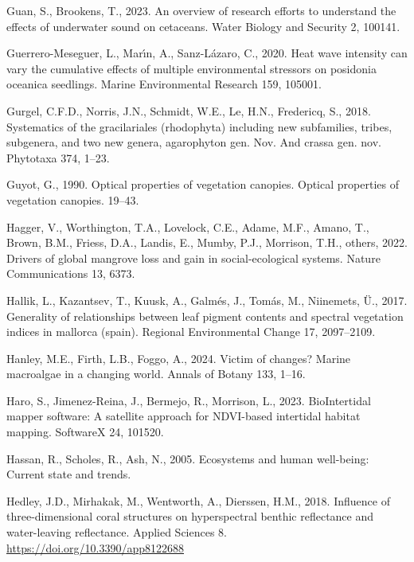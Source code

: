 \documentclass[
  letterpaper,
  11pt,
  english,
  singlespacing,
  headsepline]{MastersDoctoralThesis}
\newlength{\cslhangindent}
\newenvironment{CSLReferences}[2] %
 {\begin{list}{}{%
  \setlength{\itemindent}{0pt}
  \setlength{\leftmargin}{0pt}
  \setlength{\parsep}{0pt}
  \ifodd #1
   \setlength{\leftmargin}{\cslhangindent}
   \setlength{\itemindent}{-1\cslhangindent}
  \fi
  \setlength{\itemsep}{#2\baselineskip}}}
 {\end{list}}
\begin{document}
\begin{CSLReferences}{1}{0}
Guan, S., Brookens, T., 2023. An overview of research efforts to
understand the effects of underwater sound on cetaceans. Water Biology
and Security 2, 100141.

Guerrero-Meseguer, L., Marı́n, A., Sanz-Lázaro, C., 2020. Heat wave
intensity can vary the cumulative effects of multiple environmental
stressors on posidonia oceanica seedlings. Marine Environmental Research
159, 105001.

Gurgel, C.F.D., Norris, J.N., Schmidt, W.E., Le, H.N., Fredericq, S.,
2018. Systematics of the gracilariales (rhodophyta) including new
subfamilies, tribes, subgenera, and two new genera, agarophyton gen.
Nov. And crassa gen. nov. Phytotaxa 374, 1--23.

Guyot, G., 1990. Optical properties of vegetation canopies. Optical
properties of vegetation canopies. 19--43.

Hagger, V., Worthington, T.A., Lovelock, C.E., Adame, M.F., Amano, T.,
Brown, B.M., Friess, D.A., Landis, E., Mumby, P.J., Morrison, T.H.,
others, 2022. Drivers of global mangrove loss and gain in
social-ecological systems. Nature Communications 13, 6373.

Hallik, L., Kazantsev, T., Kuusk, A., Galmés, J., Tomás, M., Niinemets,
Ü., 2017. Generality of relationships between leaf pigment contents and
spectral vegetation indices in mallorca (spain). Regional Environmental
Change 17, 2097--2109.

Hanley, M.E., Firth, L.B., Foggo, A., 2024. Victim of changes? Marine
macroalgae in a changing world. Annals of Botany 133, 1--16.

Haro, S., Jimenez-Reina, J., Bermejo, R., Morrison, L., 2023.
BioIntertidal mapper software: A satellite approach for NDVI-based
intertidal habitat mapping. SoftwareX 24, 101520.

Hassan, R., Scholes, R., Ash, N., 2005. Ecosystems and human well-being:
Current state and trends.

Hedley, J.D., Mirhakak, M., Wentworth, A., Dierssen, H.M., 2018.
Influence of three-dimensional coral structures on hyperspectral benthic
reflectance and water-leaving reflectance. Applied Sciences 8.
\url{https://doi.org/10.3390/app8122688}


\end{CSLReferences}
\end{document}
